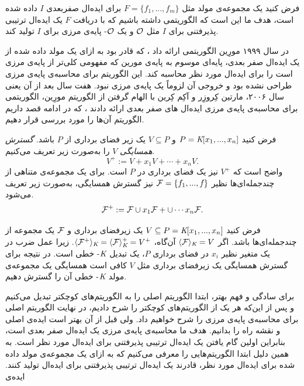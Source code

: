فرض کنید یک مجموعه‌ی مولد مثل 
$F = \{f_{1},...,f_{m}\}$
برای ایده‌ال صفربعدی
$I$
داده شده است، هدف ما این است که الگوریتمی داشته باشیم که با دریافت 
$F$
یک ایده‌ال ترتیبی پذیرفتنی برای 
$I$
مثل 
${\mathcal O}$
و یک 
${\mathcal O}$-
پایه‌ی مرزی برای 
$I$
 تولید کند. 
 
در سال ۱۹۹۹ مورِین
 الگوریتمی ارائه داد 
{\small \cite{mourrain1999new}}،
که قادر بود به ازای یک مولد داده شده از یک ایده‌ال صفر بعدی، پایه‌ای موسوم به پایه‌ی مورین که مفهومی کلی‌تر از پایه‌ی مرزی است را  برای ایده‌ال مورد نظر محاسبه کند. این الگوریتم برای محاسبه‌ی پایه‌ی مرزی طراحی نشده بود و خروجی آن لزوماً یک پایه‌ی مرزی نبود. هفت سال بعد از آن یعنی سال ۲۰۰۶، مارتین کِروزِر 
و آکِم کِرین
با الهام گرفتن از الگوریتم مورِین، الگوریتمی برای محاسبه‌ی پایه‌ی مرزی  ایده‌ال های صفر بعدی ارائه دادند
{\small \cite{kehrein2006computing}}،
که در ادامه قصد داریم الگوریتم آن‌ها را مورد بررسی قرار دهیم.

\begin{definition}
فرض کنید 
$P = \textit{K}[x_{1},...,x_{n}]$
و
$V\subseteq P$
یک زیر فضای برداری از 
$P$
باشد. 
\textit{گسترش همسایگی}
$V$
را به‌صورت زیر تعریف می‌کنیم.
$$V^{+}:= V + x_{1}V + \cdots + x_{n}V.$$
واضح است که 
$V^{+}$
نیز یک فضای برداری در 
$P$
است. برای یک مجموعه‌ی متناهی از چندجمله‌ای‌ها نظیر 
${\mathcal F} = \{f_{1},...,f_{}\}$
نیز گسترش همسایگی، به‌صورت زیر تعریف می‌شود.
$${\mathcal F}^{+} := {\mathcal F}\cup x_{1}{\mathcal F} + \cup \cdots x_{n}{\mathcal F}.$$
\end{definition}

\begin{remark}
فرض کنید 
$V\subseteq P = \textit{K}[x_{1},...,x_{n}]$
یک زیرفضای برداری و 
${\mathcal F}$
یک مجموعه از چندجمله‌ای‌ها باشد. اگر 
$\langle {\mathcal F}\rangle_{\textit{K}} = V$
آن‌گاه، 
$\langle {\mathcal F}^{+}\rangle_{\textit{K}} = \langle {\mathcal F} \rangle_{\textit{K}}^{+} = V^{+}$.
زیرا  عمل ضرب در یک متغیر نظیر 
$x_{i}$
در فضای برداری 
$P$،
یک تبدیل 
$\textit{K}$-
خطی است.
در نتیجه برای گسترش همسایگی یک زیرفضای برداری مثل 
$V$
کافی است همسایگی یک مجموعه‌ی مولد 
$\textit{K}$-
خطی آن را گسترش دهیم. 
\end{remark}

برای سادگی و فهم بهتر، ابتدا الگوریتم‌ اصلی را به الگوریتم‌های کوچکتر تبدیل می‌کنیم و پس از این‌که هر یک از الگوریتم‌های کوچکتر را شرح دادیم، در نهایت الگوریتم اصلی برای محاسبه‌ی پایه‌ی مرزی را شرح خواهیم داد. ولی قبل از آن بهتر است ایده‌ی اصلی و نقشه راه را بدانیم. هدف ما محاسبه‌ی پایه‌ی مرزی یک ایده‌ال صفر بعدی است، بنابراین اولین  گام یافتن یک ایده‌ال ترتیبی پذیرفتنی برای ایده‌ال مورد نظر است. به همین دلیل ابتدا الگوریتم‌هایی را معرفی می‌کنیم که به ازای یک مجموعه‌ی مولد داده شده برای ایده‌ال مورد نظر، قادرند یک ایده‌ال ترتیبی پذیرفتنی برای ایده‌ال تولید کنند. ایده‌ی 

